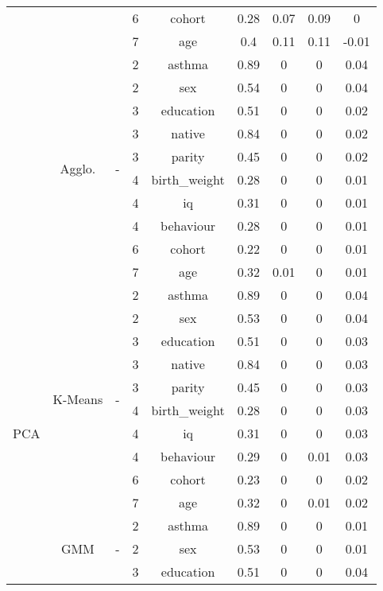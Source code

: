 \documentclass[CAT,BIB]{TFUOC}%
\begin{document}
\begin{table}
\begin{tabular}{@{}ccccccccc@{}}
            &  &  & 6 & cohort & 0.28 & 0.07 & 0.09 & 0 \\
            &  &  & 7 & age & 0.4 & 0.11 & 0.11 & -0.01 \\ \cmidrule(l){2-9}
            & \multirow{10}{*}{Agglo.} & \multirow{10}{*}{-} & 2 & asthma & 0.89 & 0 & 0 & 0.04 \\
            &  &  & 2 & sex & 0.54 & 0 & 0 & 0.04 \\
            &  &  & 3 & education & 0.51 & 0 & 0 & 0.02 \\
            &  &  & 3 & native & 0.84 & 0 & 0 & 0.02 \\
            &  &  & 3 & parity & 0.45 & 0 & 0 & 0.02 \\
            &  &  & 4 & birth\_weight & 0.28 & 0 & 0 & 0.01 \\
            &  &  & 4 & iq & 0.31 & 0 & 0 & 0.01 \\
            &  &  & 4 & behaviour & 0.28 & 0 & 0 & 0.01 \\
            &  &  & 6 & cohort & 0.22 & 0 & 0 & 0.01 \\
            &  &  & 7 & age & 0.32 & 0.01 & 0 & 0.01 \\ \midrule
            \multirow{30}{*}{PCA} & \multirow{10}{*}{K-Means} & \multirow{10}{*}{-} & 2 & asthma & 0.89 & 0 & 0 & 0.04 \\
            &  &  & 2 & sex & 0.53 & 0 & 0 & 0.04 \\
            &  &  & 3 & education & 0.51 & 0 & 0 & 0.03 \\
            &  &  & 3 & native & 0.84 & 0 & 0 & 0.03 \\
            &  &  & 3 & parity & 0.45 & 0 & 0 & 0.03 \\
            &  &  & 4 & birth\_weight & 0.28 & 0 & 0 & 0.03 \\
            &  &  & 4 & iq & 0.31 & 0 & 0 & 0.03 \\
            &  &  & 4 & behaviour & 0.29 & 0 & 0.01 & 0.03 \\
            &  &  & 6 & cohort & 0.23 & 0 & 0 & 0.02 \\
            &  &  & 7 & age & 0.32 & 0 & 0.01 & 0.02 \\ \cmidrule(l){2-9}
            & \multirow{10}{*}{GMM} & \multirow{10}{*}{-} & 2 & asthma & 0.89 & 0 & 0 & 0.01 \\
            &  &  & 2 & sex & 0.53 & 0 & 0 & 0.01 \\
            &  &  & 3 & education & 0.51 & 0 & 0 & 0.04 \\

\end{tabular}
\end{table}
\end{document}
